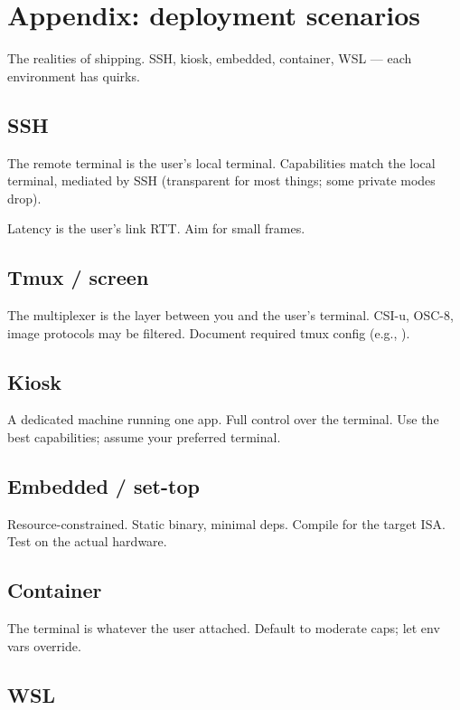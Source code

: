 \chapter{Appendix: deployment scenarios}
\label{ch:deployments}

\begin{aside}
The realities of shipping. SSH, kiosk, embedded, container,
WSL --- each environment has quirks.
\end{aside}

\section{SSH}

The remote terminal is the user's local terminal. Capabilities
match the local terminal, mediated by SSH (transparent for
most things; some private modes drop).

Latency is the user's link RTT. Aim for small frames.

\section{Tmux / screen}

The multiplexer is the layer between you and the user's
terminal. CSI-u, OSC-8, image protocols may be filtered.
Document required tmux config (e.g., ).

\section{Kiosk}

A dedicated machine running one app. Full control over
the terminal. Use the best capabilities; assume your
preferred terminal.

\section{Embedded / set-top}

Resource-constrained. Static binary, minimal deps.
Compile for the target ISA. Test on the actual hardware.

\section{Container}

The terminal is whatever the user attached. Default to
moderate caps; let env vars override.

\section{WSL}

